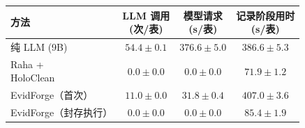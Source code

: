 \par\addvspace{6pt}\noindent\begin{minipage}{\columnwidth}
\centering
{}
\label{tab:efficiency}
\fontsize{8}{9.6}\selectfont
\setlength{\tabcolsep}{3pt}
\renewcommand{\arraystretch}{1.10}
\begin{tabular*}{\columnwidth}{@{\extracolsep{\fill}}lccc@{}}
\toprule
方法 & \makecell{LLM 调用\\(次/表)} & \makecell{模型请求\\(s/表)} & \makecell{记录阶段用时\\(s/表)} \\
\midrule
纯 LLM (9B) & $54.4\pm0.1$ & $376.6\pm5.0$ & $386.6\pm5.3$ \\
\makecell{Raha +\\HoloClean} & $0.0\pm0.0$ & $0.0\pm0.0$ & $71.9\pm1.2$ \\
EvidForge（首次） & $11.0\pm0.0$ & $31.8\pm0.4$ & $407.0\pm3.6$ \\
EvidForge（封存执行） & $0.0\pm0.0$ & $0.0\pm0.0$ & $85.4\pm1.9$ \\
\bottomrule
\end{tabular*}
\end{minipage}\par\addvspace{6pt}
